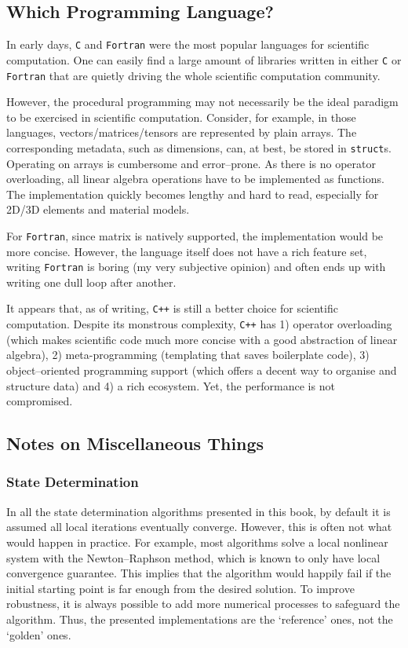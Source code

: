 \subsection{Which Programming Language?}
In early days, \texttt{C} and \texttt{Fortran} were the most popular languages for scientific computation.
One can easily find a large amount of libraries written in either \texttt{C} or \texttt{Fortran} that are quietly driving the whole scientific computation community.

However, the procedural programming may not necessarily be the ideal paradigm to be exercised in scientific computation.
Consider, for example, in those languages, vectors/matrices/tensors are represented by plain arrays.
The corresponding metadata, such as dimensions, can, at best, be stored in \texttt{struct}s.
Operating on arrays is cumbersome and error--prone.
As there is no operator overloading, all linear algebra operations have to be implemented as functions.
The implementation quickly becomes lengthy and hard to read, especially for 2D/3D elements and material models.

For \texttt{Fortran}, since matrix is natively supported, the implementation would be more concise.
However, the language itself does not have a rich feature set, writing \texttt{Fortran} is boring (my very subjective opinion) and often ends up with writing one dull loop after another.

It appears that, as of writing, \texttt{C++} is still a better choice for scientific computation.
Despite its monstrous complexity, \texttt{C++} has 1) operator overloading (which makes scientific code much more concise with a good abstraction of linear algebra), 2) meta-programming (templating that saves boilerplate code), 3) object--oriented programming support (which offers a decent way to organise and structure data) and 4) a rich ecosystem.
Yet, the performance is not compromised.
\subsection{Notes on Miscellaneous Things}
\subsubsection{State Determination}
In all the state determination algorithms presented in this book, by default it is assumed all local iterations eventually converge.
However, this is often not what would happen in practice.
For example, most algorithms solve a local nonlinear system with the Newton--Raphson method, which is known to only have local convergence guarantee.
This implies that the algorithm would happily fail if the initial starting point is far enough from the desired solution.
To improve robustness, it is always possible to add more numerical processes to safeguard the algorithm.
Thus, the presented implementations are the `reference' ones, not the `golden' ones.
